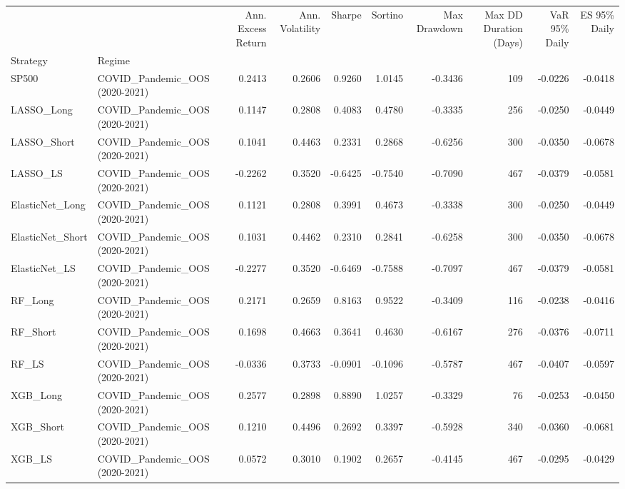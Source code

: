 \begin{tabular}{llrrrrrrrr}
\toprule
 &  & Ann. Excess Return & Ann. Volatility & Sharpe & Sortino & Max Drawdown & Max DD Duration (Days) & VaR 95\% Daily & ES 95\% Daily \\
Strategy & Regime &  &  &  &  &  &  &  &  \\
\midrule
SP500 & COVID\_Pandemic\_OOS (2020-2021) & 0.2413 & 0.2606 & 0.9260 & 1.0145 & -0.3436 & 109 & -0.0226 & -0.0418 \\
\cline{1-10}
LASSO\_Long & COVID\_Pandemic\_OOS (2020-2021) & 0.1147 & 0.2808 & 0.4083 & 0.4780 & -0.3335 & 256 & -0.0250 & -0.0449 \\
\cline{1-10}
LASSO\_Short & COVID\_Pandemic\_OOS (2020-2021) & 0.1041 & 0.4463 & 0.2331 & 0.2868 & -0.6256 & 300 & -0.0350 & -0.0678 \\
\cline{1-10}
LASSO\_LS & COVID\_Pandemic\_OOS (2020-2021) & -0.2262 & 0.3520 & -0.6425 & -0.7540 & -0.7090 & 467 & -0.0379 & -0.0581 \\
\cline{1-10}
ElasticNet\_Long & COVID\_Pandemic\_OOS (2020-2021) & 0.1121 & 0.2808 & 0.3991 & 0.4673 & -0.3338 & 300 & -0.0250 & -0.0449 \\
\cline{1-10}
ElasticNet\_Short & COVID\_Pandemic\_OOS (2020-2021) & 0.1031 & 0.4462 & 0.2310 & 0.2841 & -0.6258 & 300 & -0.0350 & -0.0678 \\
\cline{1-10}
ElasticNet\_LS & COVID\_Pandemic\_OOS (2020-2021) & -0.2277 & 0.3520 & -0.6469 & -0.7588 & -0.7097 & 467 & -0.0379 & -0.0581 \\
\cline{1-10}
RF\_Long & COVID\_Pandemic\_OOS (2020-2021) & 0.2171 & 0.2659 & 0.8163 & 0.9522 & -0.3409 & 116 & -0.0238 & -0.0416 \\
\cline{1-10}
RF\_Short & COVID\_Pandemic\_OOS (2020-2021) & 0.1698 & 0.4663 & 0.3641 & 0.4630 & -0.6167 & 276 & -0.0376 & -0.0711 \\
\cline{1-10}
RF\_LS & COVID\_Pandemic\_OOS (2020-2021) & -0.0336 & 0.3733 & -0.0901 & -0.1096 & -0.5787 & 467 & -0.0407 & -0.0597 \\
\cline{1-10}
XGB\_Long & COVID\_Pandemic\_OOS (2020-2021) & 0.2577 & 0.2898 & 0.8890 & 1.0257 & -0.3329 & 76 & -0.0253 & -0.0450 \\
\cline{1-10}
XGB\_Short & COVID\_Pandemic\_OOS (2020-2021) & 0.1210 & 0.4496 & 0.2692 & 0.3397 & -0.5928 & 340 & -0.0360 & -0.0681 \\
\cline{1-10}
XGB\_LS & COVID\_Pandemic\_OOS (2020-2021) & 0.0572 & 0.3010 & 0.1902 & 0.2657 & -0.4145 & 467 & -0.0295 & -0.0429 \\

\end{tabular}
